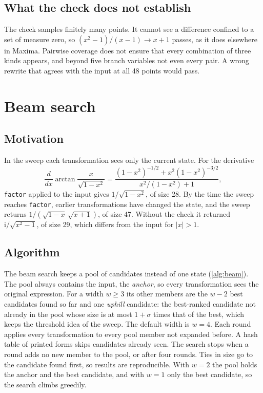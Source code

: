 \documentclass[11pt]{amsart}
\newcommand{\mx}{\lstinline[style=mx]}
\theoremstyle{definition}
\theoremstyle{remark}
\begin{document}
\subsection{What the check does not establish}

The check samples finitely many points. It cannot see a
difference confined to a set of measure zero, so $(x^2-1)/(x-1) \to x + 1$
passes, as it does elsewhere in Maxima. Pairwise coverage does not ensure
that every combination of three kinds appears, and beyond five branch
variables not even every pair. A wrong rewrite that agrees with the input at
all 48 points would pass.

\section{Beam search}\label{sec:beam}

\subsection{Motivation}

In the sweep each transformation sees only the current state. For the
derivative
\[
  \frac{d}{dx}\arctan\frac{x}{\sqrt{1-x^2}}
  = \frac{(1-x^2)^{-1/2} + x^2(1-x^2)^{-3/2}}{x^2/(1-x^2) + 1},
\]
\mx|factor| applied to the input gives $1/\sqrt{1-x^2}$, of size 28. By the
time the sweep reaches \mx|factor|, earlier transformations have changed the
state, and the sweep returns $1/(\sqrt{1-x}\,\sqrt{x+1})$, of size 47. Without
the check it returned $\mathrm{i}/\sqrt{x^2-1}$, of size 29, which differs
from the input for $|x| > 1$.

\subsection{Algorithm}

The beam search \cite{Lowerre76} keeps a pool of candidates instead of one
state (\cref{alg:beam}). The pool always contains the input, the
\emph{anchor}, so every transformation sees the original expression. For a
width $w \ge 3$ its other members are the $w-2$ best candidates found so far
and one \emph{uphill} candidate: the best-ranked candidate not already in
the pool whose size is at most $1+\sigma$ times that of the best, which
keeps the threshold idea of the sweep. The default width is $w = 4$. Each round applies every
transformation to every pool member not expanded before. A hash table of
printed forms skips candidates already seen. The search stops when a round
adds no new member to the pool, or after four rounds. Ties in size go to
the candidate found first, so results are reproducible. With $w = 2$ the
pool holds the anchor and the best candidate, and with $w = 1$ only the best
candidate, so the search climbs greedily.
\end{document}
